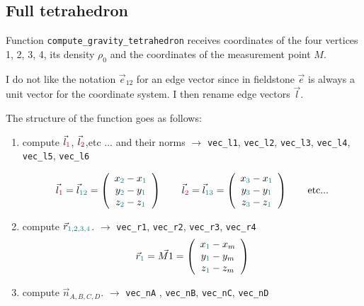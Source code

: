 \subsection*{Full tetrahedron}

Function \verb|compute_gravity_tetrahedron| receives coordinates of the four vertices {\color{teal}1}, 
{\color{teal}2}, {\color{teal}3}, {\color{teal}4}, its density $\rho_0$ and the coordinates of the 
measurement point $M$.

I do not like the notation $\vec{e}_{12}$ for an edge vector since in fieldstone $\vec{e}$ is always 
a unit vector for the coordinate system. I then rename edge vectors $\vec{l}$.

The structure of the function goes as follows:
\begin{enumerate}
\item compute $\vec{l}_{\color{purple}1}$, $\vec{l}_{\color{purple}2}$,etc ... and their norms 
$\rightarrow$ \verb|vec_l1|, \verb|vec_l2|, \verb|vec_l3|, \verb|vec_l4|, \verb|vec_l5|, \verb|vec_l6|

\[
\vec{l}_{\color{purple}1} = \vec{l}_{\color{teal}12} = \left(
\begin{array}{c}
x_{\color{teal}2}-x_{\color{teal}1} \\
y_{\color{teal}2}-y_{\color{teal}1} \\
z_{\color{teal}2}-z_{\color{teal}1}
\end{array}
\right)
\qquad
\vec{l}_{\color{purple}2} = \vec{l}_{\color{teal}13} = \left(
\begin{array}{c}
x_{\color{teal}3}-x_{\color{teal}1} \\
y_{\color{teal}3}-y_{\color{teal}1} \\
z_{\color{teal}3}-z_{\color{teal}1}
\end{array}
\right)
\qquad
\textrm{etc...}
\]


\item compute $\vec{r}_{\color{teal} 1,2,3,4}$. $\rightarrow$ \verb|vec_r1|, \verb|vec_r2|, \verb|vec_r3|, \verb|vec_r4|
\[
\vec{r}_{\color{teal}1} = \vec{M1} = \left(
\begin{array}{c}
x_{\color{teal}1}-x_m \\
y_{\color{teal}1}-y_m \\
z_{\color{teal}1}-z_m
\end{array}
\right)
\]



\item compute $\vec{n}_{A,B,C,D}$. 
$\rightarrow$ \verb|vec_nA| , \verb|vec_nB|, \verb|vec_nC|, \verb|vec_nD|


\end{enumerate}

